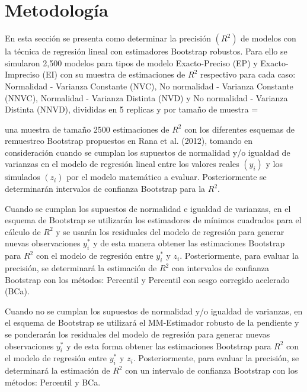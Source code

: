 \section{Metodología}

En esta sección se presenta como determinar la precisión $(R^{2})$ de modelos con la técnica de regresión lineal con estimadores Bootstrap robustos. Para ello se simularon 2,500 modelos para tipos de modelo Exacto-Preciso (EP) y Exacto-Impreciso (EI) con su muestra de estimaciones de $R^{2}$ respectivo para cada caso: Normalidad - Varianza Constante (NVC), No normalidad - Varianza Constante (NNVC), Normalidad - Varianza Distinta (NVD) y No normalidad - Varianza Distinta (NNVD), divididas en 5 replicas y por tamaño de muestra  = 


 una muestra de tamaño 2500 estimaciones de $R^{2}$ con los diferentes esquemas de remuestreo Bootstrap propuestos en Rana et al. (2012), tomando en consideración cuando se cumplan los supuestos de normalidad y/o igualdad de varianzas en el modelo de regresión lineal entre los valores reales $( y_{i} )$  y los simulados $( z_{i} )$ por el modelo matemático a evaluar. Posteriormente se determinarán intervalos de confianza Bootstrap para la  $R^{2}$.
\vspace{.5cm}



Cuando se cumplan los supuestos de normalidad e igualdad de varianzas, en el esquema de Bootstrap se utilizarán los estimadores de mínimos cuadrados para el cálculo de $R^{2}$ y se usarán los residuales del modelo de regresión para generar nuevas observaciones $ y_{i}^{*} $ y de esta manera obtener las estimaciones Bootstrap para $R^{2}$  con el modelo de regresión entre $ y_{i}^{*} $  y  $ z_{i} $. Posteriormente, para evaluar la precisión, se determinará la estimación de $R^{2}$ con intervalos de confianza Bootstrap con los métodos: Percentil y Percentil con sesgo corregido acelerado (BCa).
\vspace{.5cm}

Cuando no se cumplan los supuestos de normalidad y/o igualdad de varianzas, en el esquema de Bootstrap se utilizará el MM-Estimador robusto de la pendiente y se ponderarán los residuales del modelo de regresión para generar nuevas observaciones $ y_{i}^{*} $ y de esta forma obtener las estimaciones Bootstrap para $R^{2}$ con el modelo de regresión entre $ y_{i}^{*} $  y  $ z_{i} $. Posteriormente,
para evaluar la precisión, se determinará la estimación de $R^{2}$ con un intervalo de confianza Bootstrap con los métodos:  Percentil y BCa.
\vspace{.5cm}


